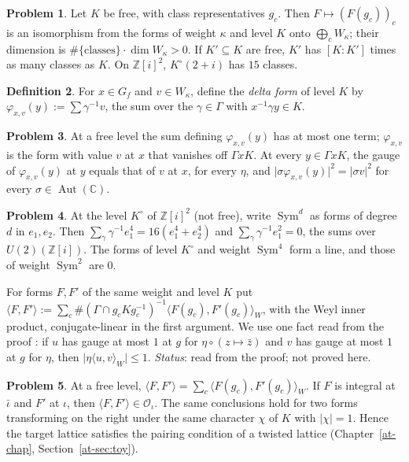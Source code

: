 \documentclass[reqno]{amsart}
\newcounter{chap}
\theoremstyle{definition}
\newtheorem{problem}{Problem}[section]
\newtheorem{definition}[problem]{Definition}
\theoremstyle{plain}
\theoremstyle{remark}
\newcommand{\Z}{\mathbb{Z}}
\newcommand{\C}{\mathbb{C}}
\newcommand{\Oc}{\mathcal{O}}
\newcommand{\Aut}{\operatorname{Aut}}
\newcommand{\Sym}{\operatorname{Sym}}
\newcommand{\Ko}{K^\circ}
\begin{document}
\begin{problem}\label{pr:dim-free}
Let \(K\) be free, with class representatives \(g_c\).  Then \(F\mapsto(F(g_c))_c\) is an isomorphism from the forms of weight \(\kappa\) and level \(K\) onto \(\bigoplus_cW_\kappa\); their dimension is \(\#\{\text{classes}\}\cdot\dim W_\kappa>0\).  If \(K'\subseteq K\) are free, \(K'\) has \([K:K']\) times as many classes as \(K\).  On \(\Z[i]^2\), \(\Ko(2+i)\) has \(15\) classes.
\end{problem}

\begin{definition}\label{def:delta}
For \(x\in G_f\) and \(v\in W_\kappa\), define the \emph{delta form} of level \(K\) by \(\varphi_{x,v}(y):=\sum\gamma^{-1}v\), the sum over the \(\gamma\in\Gamma\) with \(x^{-1}\gamma y\in K\).
\end{definition}

\begin{problem}\label{pr:delta}
At a free level the sum defining \(\varphi_{x,v}(y)\) has at most one term; \(\varphi_{x,v}\) is the form with value \(v\) at \(x\) that vanishes off \(\Gamma xK\).  At every \(y\in\Gamma xK\), the gauge of \(\varphi_{x,v}(y)\) at \(y\) equals that of \(v\) at \(x\), for every \(\eta\), and \(\lvert\sigma\varphi_{x,v}(y)\rvert^2=\lvert\sigma v\rvert^2\) for every \(\sigma\in\Aut(\C)\).
\end{problem}

\begin{problem}\label{pr:full-level}
At the level \(\Ko\) of \(\Z[i]^2\) (not free), write \(\Sym^d\) as forms of degree \(d\) in \(e_1,e_2\).  Then \(\sum_\gamma\gamma^{-1}e_1^4=16(e_1^4+e_2^4)\) and \(\sum_\gamma\gamma^{-1}e_1^2=0\), the sums over \(U(2)(\Z[i])\).  The forms of level \(\Ko\) and weight \(\Sym^4\) form a line, and those of weight \(\Sym^2\) are \(0\).
\end{problem}

For forms \(F,F'\) of the same weight and level \(K\) put \(\langle F,F'\rangle:=\sum_c\#(\Gamma\cap g_cKg_c^{-1})^{-1}\langle F(g_c),F'(g_c)\rangle_W\), with the Weyl inner product, conjugate-linear in the first argument.  We use one fact read from the proof \cite{GL}: if \(u\) has gauge at most \(1\) at \(g\) for \(\eta\circ(z\mapsto\bar z)\) and \(v\) has gauge at most \(1\) at \(g\) for \(\eta\), then \(\lvert\eta\langle u,v\rangle_W\rvert\le1\).  \emph{Status}: read from the proof; not proved here.

\begin{problem}\label{pr:pairing}
At a free level, \(\langle F,F'\rangle=\sum_c\langle F(g_c),F'(g_c)\rangle_W\).  If \(F\) is integral at \(\bar\iota\) and \(F'\) at \(\iota\), then \(\langle F,F'\rangle\in\Oc_\iota\).  The same conclusions hold for two forms transforming on the right under the same character \(\chi\) of \(K\) with \(\lvert\chi\rvert=1\).  Hence the target lattice satisfies the pairing condition of a twisted lattice (Chapter~\ref{at-chap}, Section~\ref{at-sec:toy}).
\end{problem}
\end{document}
